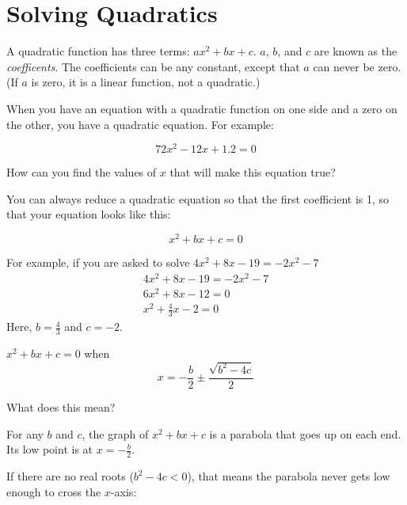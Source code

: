 \chapter{Solving Quadratics}

A quadratic function has three terms: $ax^2 + bx + c$. $a$, $b$, and
$c$ are known as the \textit{coefficents}. The coefficients can be any
constant, except that $a$ can never be zero. (If $a$ is zero, it is a linear
function, not a quadratic.)

When you have an equation with a quadratic function on one side and a
zero on the other, you have a quadratic equation. For example:

$$72x^2 - 12x + 1.2 = 0$$

How can you find the values of $x$ that will make this equation true?

You can always reduce a quadratic equation so that the first
coefficient is 1, so that your equation looks like this:

$$x^2 +bx + c = 0$$

For example, if you are asked to solve $4x^2 + 8x - 19 = -2x^2 - 7$
\begin{multline*}
  4x^2 + 8x - 19 = -2x^2 - 7 \\
  6x^2 + 8x -12 = 0 \\
  x^2 + \frac{4}{3}x - 2 = 0
\end{multline*}
Here, $b = \frac{4}{3}$ and $c = -2$.

\begin{mdframed}[style=important]
$x^2 + bx + c = 0$ when
\begin{equation*}
x = -\frac{b}{2} \pm \frac{\sqrt{b^2 - 4c}}{2}  
\end{equation*}
\end{mdframed}

What does this mean?

For any $b$ and $c$, the graph of $x^2 + bx + c$ is a parabola
that goes up on each end. Its low point is at $x = -\frac{b}{2}$.

If there are no real roots ($b^2 - 4c < 0$), that means the
parabola never gets low enough to cross the $x$-axis:


